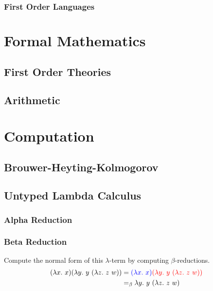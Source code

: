 \documentclass{book}
\begin{document}

        \subsection{First Order Languages}

\chapter{Formal Mathematics}

    \newpage
    \section{First Order Theories}    
    
    \newpage
    \section{Arithmetic}

\chapter{Computation}

    \newpage
    \section{Brouwer-Heyting-Kolmogorov}

    \newpage
    \section{Untyped Lambda Calculus}

    \subsection*{Alpha Reduction}

    \subsection*{Beta Reduction}


    \begin{eg}
        Compute the normal form of this $\lambda$-term by computing $\beta$-reductions. 
        \begin{align*}
            (\lambda x. \ x)(\lambda y. \ y \ (\lambda z. \ z \ w)) &= \textcolor{blue}{(\lambda x. \ x)} \textcolor{red}{(\lambda y. \ y \ (\lambda z. \ z \ w))} \\
            &=_{\beta} \lambda y. \ y \ (\lambda z. \ z \ w)
        \end{align*}
    \end{eg}
    
\end{document}
